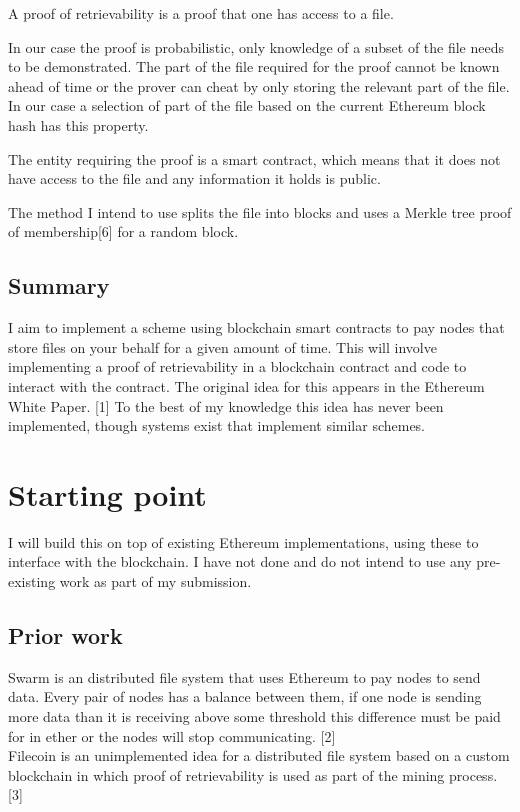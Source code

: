 \documentclass[oneside]{article}
\begin{document}
A proof of retrievability is a proof that one has access to a file.

In our case the proof is probabilistic, only knowledge of a subset of the file needs to be demonstrated.
The part of the file required for the proof cannot be known ahead of time or the prover can cheat by only storing the relevant part of the file.
In our case a selection of part of the file based on the current Ethereum block hash has this property.

The entity requiring the proof is a smart contract, which means that it does not have access to the file and any information it holds is public.

The method I intend to use splits the file into blocks and uses a Merkle tree proof of membership[6] for a random block.

\subsection{Summary}

I aim to implement a scheme using blockchain smart contracts to pay nodes that store files on your behalf for a given amount of time.
This will involve implementing a proof of retrievability in a blockchain contract and code to interact with the contract.
The original idea for this appears in the Ethereum White Paper. [1]
To the best of my knowledge this idea has never been implemented, though systems exist that implement similar schemes.

\section{Starting point}

I will build this on top of existing Ethereum implementations, using these to interface with the blockchain.
I have not done and do not intend to use any pre-existing work as part of my submission.

\subsection{Prior work}
Swarm is an distributed file system that uses Ethereum to pay nodes to send data. Every pair of nodes has a balance between them, if one node is sending more data than it is receiving above some threshold this difference must be paid for in ether or the nodes will stop communicating. [2]\\

Filecoin is an unimplemented idea for a distributed file system based on a custom blockchain in which proof of retrievability is used as part of the mining process. [3]\\
\end{document}
